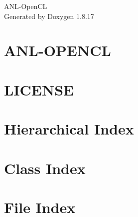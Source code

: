 \let\mypdfximage\pdfximage\def\pdfximage{\immediate\mypdfximage}\documentclass[twoside]{book}
\newcommand{\+}{\discretionary{\mbox{\scriptsize$\hookleftarrow$}}{}{}}
\newcommand{\clearemptydoublepage}{%
  \newpage{\pagestyle{empty}\cleardoublepage}%
}
\begin{document}
\hypersetup{pageanchor=false,
             bookmarksnumbered=true,
             pdfencoding=unicode
            }
\begin{titlepage}
\vspace*{7cm}
\begin{center}%
{\Large A\+N\+L-\/\+Open\+CL }\\
\vspace*{1cm}
{\large Generated by Doxygen 1.8.17}\\
\end{center}
\end{titlepage}
\clearemptydoublepage
{}
\tableofcontents
\clearemptydoublepage
{}
\hypersetup{pageanchor=true}

\chapter{A\+N\+L-\/\+O\+P\+E\+N\+CL}
\label{index}\hypertarget{index}{}
\chapter{L\+I\+C\+E\+N\+SE}
\label{md_src_main_cpp_extern_RandomCL_LICENSE}

\chapter{Hierarchical Index}

\chapter{Class Index}

\chapter{File Index}

\end{document}
